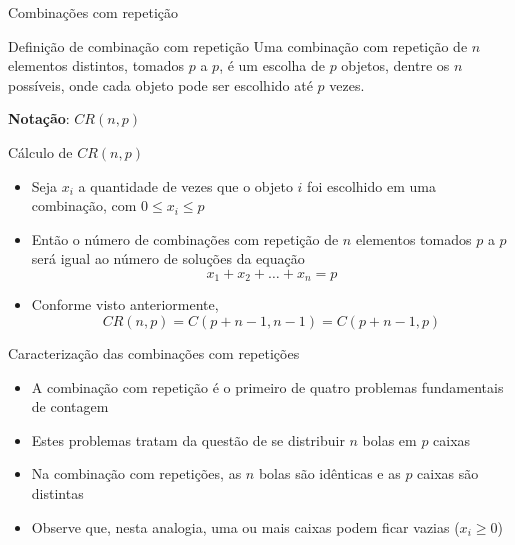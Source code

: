 \begin{frame}[fragile]{Combinações com repetição}

    \begin{block}{Definição de combinação com repetição}
        Uma combinação com repetição de $n$ elementos distintos, tomados $p$ a $p$, é um escolha de
        $p$ objetos, dentre os $n$ possíveis, onde cada objeto pode ser escolhido até $p$ vezes.  

        \textbf{Notação}: $CR(n, p)$
    \end{block}

\end{frame}

\begin{frame}[fragile]{Cálculo de $CR(n, p)$}

    \begin{itemize}
        \item Seja $x_i$ a quantidade de vezes que o objeto $i$ foi escolhido em uma combinação,
            com $0 \leq x_i\leq p$

        \item Então o número de combinações com repetição de $n$ elementos tomados $p$ a $p$ será
            igual ao número de soluções da equação
$$
    x_1 + x_2 + \ldots + x_n = p
$$

        \item Conforme visto anteriormente,
$$
    CR(n, p) = C(p + n - 1, n - 1) = C(p + n - 1, p)
$$
    \end{itemize}

\end{frame}

\begin{frame}[fragile]{Caracterização das combinações com repetições}

    \begin{itemize}
        \item A combinação com repetição é o primeiro de quatro problemas fundamentais de contagem

        \item Estes problemas tratam da questão de se distribuir $n$ bolas em $p$ caixas

        \item Na combinação com repetições, as $n$ bolas são idênticas e as $p$ caixas são distintas

        \item  Observe que, nesta analogia, uma ou mais caixas podem ficar vazias ($x_i\geq 0$)
    \end{itemize}

\end{frame}

